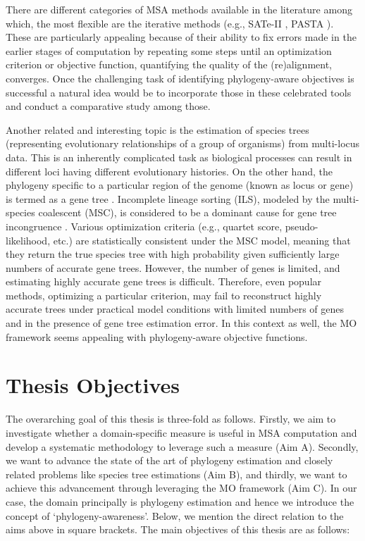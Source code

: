 There are different categories of MSA methods available in the literature among which, the most flexible are the iterative methods (e.g., SATe-II \cite{liu2012sate}, PASTA \cite{mirarab2015pasta}). These are particularly appealing because of their ability to fix errors made in the earlier stages of computation by repeating some steps until an optimization criterion or objective function, quantifying the quality of the (re)alignment, converges. Once the challenging task of identifying phylogeny-aware objectives is successful a natural idea would be to incorporate those in these celebrated tools and conduct a comparative study among those.    

Another related and interesting topic is the estimation of species trees (representing evolutionary relationships of a group of organisms) from multi-locus data. This is an inherently complicated task as biological processes can result in different loci having different evolutionary histories. On the other hand, the phylogeny specific to a particular region of the genome (known as locus or gene) is termed as a gene tree \cite{maddison1997gene}. Incomplete lineage sorting (ILS), modeled by the multi-species coalescent (MSC), is considered to be a dominant cause for gene tree incongruence \cite{mirarab2014evaluating, statistical-binning}. Various optimization criteria (e.g., quartet score, pseudo-likelihood, etc.) are statistically consistent under the MSC model, meaning that they return the true species tree with high probability given sufficiently large numbers of accurate gene trees. However, the number of genes is limited, and estimating highly accurate gene trees is difficult. Therefore, even popular methods, optimizing a particular criterion, may fail to reconstruct highly accurate trees under practical model conditions with limited numbers of genes and in the presence of gene tree estimation error. In this context as well, the MO framework seems appealing with phylogeny-aware objective functions.

\section{Thesis Objectives}

The overarching goal of this thesis is three-fold as follows. Firstly, we aim to investigate whether a domain-specific measure is useful in MSA computation and develop a systematic methodology to leverage such a measure (Aim A). Secondly, we want to advance the state of the art of phylogeny estimation and closely related problems like species tree estimations (Aim B), and thirdly, we want to achieve this advancement through leveraging the MO framework (Aim C). In our case, the domain principally is phylogeny estimation and hence we introduce the concept of ‘phylogeny-awareness’. Below, we mention the direct relation to the aims above in square brackets. The main objectives of this thesis are as follows:

